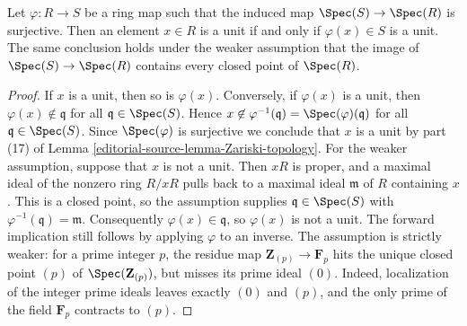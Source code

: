 \begin{lemma}
\label{editorial-source-lemma-surjective-on-spec-units}
Let $\varphi : R \to S$ be a ring map such that the induced map
$\Spec(S) \to \Spec(R)$ is surjective. Then an element $x \in R$
is a unit if and only if $\varphi(x) \in S$ is a unit.
The same conclusion holds under the weaker assumption that the image
of $\Spec(S)\to\Spec(R)$ contains every closed point of $\Spec(R)$.
\end{lemma}

\begin{proof}
If $x$ is a unit, then so is $\varphi(x)$. Conversely, if $\varphi(x)$
is a unit, then $\varphi(x) \not \in \mathfrak q$ for all
$\mathfrak q \in \Spec(S)$. Hence
$x \not \in \varphi^{-1}(\mathfrak q) = \Spec(\varphi)(\mathfrak q)$
for all $\mathfrak q \in \Spec(S)$. Since $\Spec(\varphi)$ is surjective
we conclude that $x$ is a unit by
part (17) of Lemma \ref{editorial-source-lemma-Zariski-topology}.
For the weaker assumption, suppose that $x$ is not a unit.
Then $xR$ is proper, and a maximal ideal of the nonzero ring $R/xR$
pulls back to a maximal ideal $\mathfrak m$ of $R$ containing $x$.
This is a closed point, so the assumption supplies
$\mathfrak q\in\Spec(S)$ with
$\varphi^{-1}(\mathfrak q)=\mathfrak m$.
Consequently $\varphi(x)\in\mathfrak q$, so $\varphi(x)$ is not a unit.
The forward implication still follows by applying $\varphi$ to an inverse.
The assumption is strictly weaker: for a prime integer $p$, the residue map
$\mathbf Z_{(p)}\to\mathbf F_p$ hits the unique closed point $(p)$
of $\Spec(\mathbf Z_{(p)})$, but misses its prime ideal $(0)$.
Indeed, localization of the integer prime ideals leaves exactly $(0)$
and $(p)$, and the only prime of the field $\mathbf F_p$ contracts to $(p)$.
\end{proof}